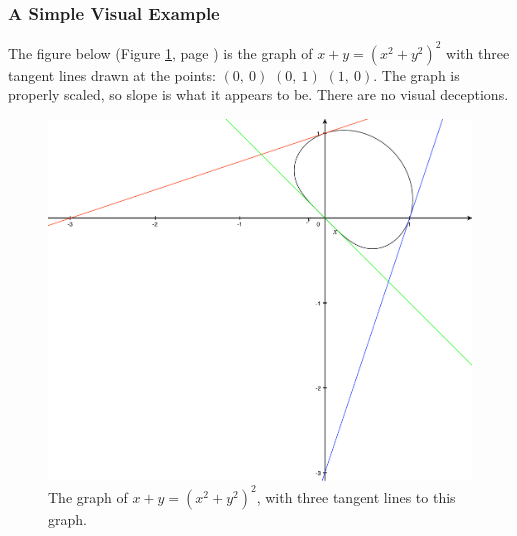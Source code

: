 \documentclass[12pt,addpoints, answers, fleqn]{exam}
\begin{document}
\subsubsection{A Simple Visual Example}
The figure below (Figure \ref{fig:graph1801}, page \pageref{fig:graph1801}) is the graph of $x+y = \left( x^2 + y^2 \right)^2$
with three tangent lines drawn at the points: $\left( 0, \ 0 \right)$ $\left( 0, \ 1\right)$ $\left( 1, \ 0 \right)$. The graph is properly scaled, so slope is what it appears to be. There are no visual deceptions.
\begin{figure}[htbp] %
   \centering
   \includegraphics[width=5in]{./graphics/graph1801.pdf} 
   \caption{The graph of $x+y = \left( x^2 + y^2 \right)^2$, with three tangent lines to this graph.}
   \label{fig:graph1801}
\end{figure}
\end{document}
